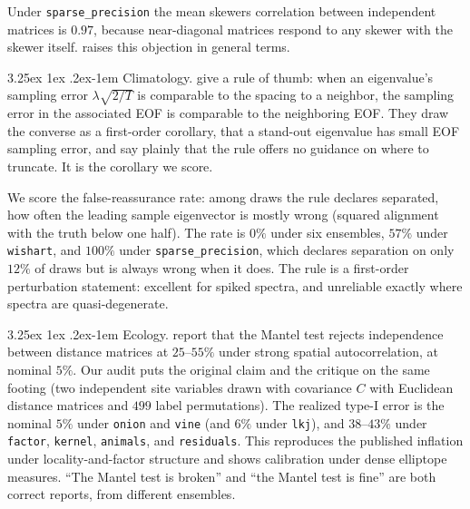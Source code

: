 \documentclass[11pt]{article}
\makeatletter
\renewcommand\paragraph{\@startsection{paragraph}{4}{\z@}%
  {3.25ex \@plus1ex \@minus.2ex}{-1em}%
  {\normalfont\normalsize\itshape}}
\renewcommand\paragraph{\@startsection{paragraph}{4}{\z@}%
  {3.25ex \@plus1ex \@minus.2ex}{-1em}%
  {\normalfont\normalsize\itshape}}
\makeatother
\begin{document}
Under \texttt{sparse\_precision} the mean skewers correlation between
independent matrices is $0.97$, because near-diagonal matrices respond to
any skewer with the skewer itself. \citet{rohlf2017} raises this objection
in general terms.

\paragraph{Climatology.} \citet{north1982} give a rule of thumb: when an eigenvalue's sampling error
$\lambda\sqrt{2/T}$ is comparable to the spacing to a neighbor, the sampling
error in the associated EOF is comparable to the neighboring EOF. They draw the converse as a first-order corollary, that a stand-out
eigenvalue has small EOF sampling error, and say plainly that the rule
offers no guidance on where to truncate. It is the corollary we score.

We score the false-reassurance rate: among draws the rule declares
separated, how often the leading sample eigenvector is mostly wrong
(squared alignment with the truth below one half). The rate is $0\%$ under six
ensembles, $57\%$ under \texttt{wishart}, and $100\%$ under
\texttt{sparse\_precision}, which declares separation on only $12\%$ of
draws but is always wrong when it does. The rule is a first-order
perturbation statement: excellent for spiked spectra, and unreliable
exactly where spectra are quasi-degenerate.

\paragraph{Ecology.} \citet{guillot2013} report that the Mantel test
\citep{mantel1967} rejects independence between distance matrices at $25$--$55\%$ under
strong spatial autocorrelation, at nominal $5\%$. Our audit puts the
original claim and the critique on the same footing (two independent site
variables drawn with covariance $C$ with Euclidean distance matrices and $499$
label permutations). The realized type-I error is the nominal $5\%$ under
\texttt{onion} and \texttt{vine} (and $6\%$ under \texttt{lkj}), and
$38$--$43\%$ under \texttt{factor}, \texttt{kernel}, \texttt{animals},
and \texttt{residuals}. This reproduces the published inflation under
locality-and-factor structure and shows calibration under dense elliptope
measures. ``The Mantel test is broken'' and ``the Mantel test is fine''
are both correct reports, from different ensembles.
\end{document}

